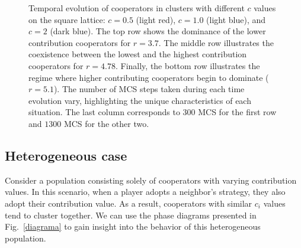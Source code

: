 \documentclass[twocolumn,aps,amsmath,pre,floatfix,superscriptaddress]{revtex4-2}
\begin{document}
\begin{figure}[t]
\begin{center}
    \caption{
    Temporal evolution of cooperators in clusters with different $c$ values on the square lattice: $c=0.5$ (light red), $c=1.0$ (light blue), and $c=2$ (dark blue). The top row shows the dominance of the lower contribution cooperators for $r=3.7$. The middle row illustrates the coexistence between the lowest and the highest contribution cooperators for $r=4.78$. Finally, the bottom row illustrates the regime  where higher contributing cooperators begin to dominate ($r=5.1$).  
   The number of MCS steps taken during each time evolution vary, highlighting the unique characteristics of each situation. The last column corresponds to $300$ MCS for the first row and $1300$ MCS for the other two. 
    }
    \label{corte}
    \end{center}
\end{figure}


\subsection{Heterogeneous case}
\label{het}
%


Consider a population consisting solely of cooperators with varying contribution values. In this scenario, when a player adopts a neighbor's strategy, they also adopt their contribution value. As a result, cooperators with similar $c_i$ values tend to cluster together. We can use the phase diagrams presented in Fig.~\ref{diagrama} to gain insight into the behavior of this heterogeneous population.
\end{document}

